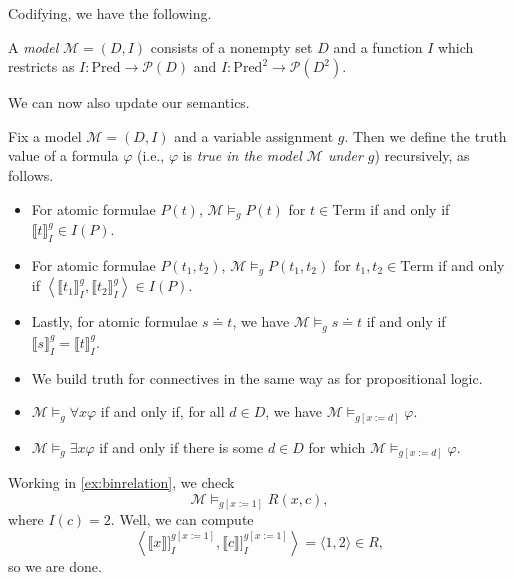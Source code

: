 Codifying, we have the following.
\begin{defihelper}[Model]
	A \textit{model} $\mathcal M=(D,I)$ consists of a nonempty set $D$ and a function $I$ which restricts as $I:\mathrm{Pred}\to\mathcal P(D)$ and $I:\mathrm{Pred}^2\to\mathcal P\left(D^2\right)$.
\end{defihelper}
We can now also update our semantics.
\begin{defihelper}[Truth]
	Fix a model $\mathcal M=(D,I)$ and a variable assignment $g$. Then we define the truth value of a formula $\varphi$ (i.e., $\varphi$ is \textit{true in the model $\mathcal M$ under $g$}) recursively, as follows.
	\begin{itemize}
		\item For atomic formulae $P(t)$, $\mathcal M\models_gP(t)$ for $t\in\mathrm{Term}$ if and only if $\llbracket t\rrbracket_I^g\in I(P)$.
		\item For atomic formulae $P(t_1,t_2)$, $\mathcal M\models_gP(t_1,t_2)$ for $t_1,t_2\in\mathrm{Term}$ if and only if $\left\langle\llbracket t_1\rrbracket_I^g,\llbracket t_2\rrbracket_I^g\right\rangle\in I(P)$.
		\item Lastly, for atomic formulae $s\doteq t$, we have $\mathcal M\models_gs\doteq t$ if and only if $\llbracket s\rrbracket_I^g=\llbracket t\rrbracket_I^g$.
		\item We build truth for connectives in the same way as for propositional logic.
		\item $\mathcal M\models_g\forall x\varphi$ if and only if, for all $d\in D$, we have $\mathcal M\models_{g[x:=d]}\varphi$.
		\item $\mathcal M\models_g\exists x\varphi$ if and only if there is some $d\in D$ for which $\mathcal M\models_{g[x:=d]}\varphi$.
	\end{itemize}
\end{defihelper}
\begin{example}
	Working in \autoref{ex:binrelation}, we check
	\[\mathcal M\models_{g{[x:=1]}}R(x,c),\]
	where $I(c)=2$. Well, we can compute
	\[\left\langle\llbracket x\rrbracket]_I^{g[x:=1]},\llbracket c\rrbracket]_I^{g[x:=1]}\right\rangle=\langle1,2\rangle\in R,\]
	so we are done.
\end{example}

